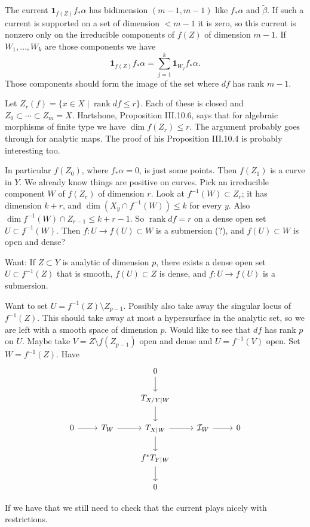 \documentclass[11pt]{amsart}
\theoremstyle{definition}
\newcommand{\cc}[1]{\mathcal{#1}}
\def\rank{\operatorname{rank}}
\begin{document}
The current $\mathbf{1}_{f(Z)} f_* \alpha$ has bidimension $(m-1,m-1)$ like $f_*\alpha$ and $\tilde\beta$.
If such a current is supported on a set of dimension $< m-1$ it is zero, so this current is nonzero only on the irreducible components of $f(Z)$ of dimension $m-1$.
If $W_1, \ldots, W_k$ are those components we have
\[
\mathbf{1}_{f(Z)} f_* \alpha
= \sum_{j=1}^k \mathbf{1}_{W_j} f_*\alpha.
\]
Those components should form the image of the set where $df$ has rank $m-1$.


Let $Z_r(f) = \{ x \in X \mid \rank df \leq r \}$.
Each of these is closed and $Z_0 \subset \cdots \subset Z_m = X$.
Hartshone, Proposition III.10.6, says that for algebraic morphisms of finite type we have $\dim f(Z_r) \leq r$.
The argument probably goes through for analytic maps.
The proof of his Proposition III.10.4 is probably interesting too.

In particular $f(Z_0)$, where $f_*\alpha = 0$, is just some points.
Then $f(Z_1)$ is a curve in $Y$.
We already know things are positive on curves.
Pick an irreducible component $W$ of $f(Z_r)$ of dimension $r$.
Look at $f^{-1}(W) \subset Z_r$; it has dimension $k+r$, and $\dim(X_y \cap f^{-1}(W)) \leq k$ for every $y$.
Also $\dim f^{-1}(W) \cap Z_{r-1} \leq k+r-1$.
So $\rank df = r$ on a dense open set $U \subset f^{-1}(W)$.
Then $f : U \to f(U) \subset W$ is a submersion (?), and $f(U) \subset W$ is open and dense?

Want: If $Z \subset Y$ is analytic of dimension $p$, there exists a dense open set $U \subset f^{-1}(Z)$ that is smooth, $f(U) \subset Z$ is dense, and $f : U \to f(U)$ is a submersion.


Want to set $U = f^{-1}(Z) \setminus Z_{p-1}$.
Possibly also take away the singular locus of $f^{-1}(Z)$.
This should take away at most a hypersurface in the analytic set, so we are left with a smooth space of dimension $p$.
Would like to see that $df$ has rank $p$ on $U$.
Maybe take $V = Z \setminus f(Z_{p-1})$ open and dense and $U = f^{-1}(V)$ open.
Set $W = f^{-1}(Z)$.
Have
\[
\begin{tikzcd}
& & 0 \ar[d] & & 
\\
& & T_{X/Y|W} \ar[d] & &
\\
0 \ar[r] &
T_W \ar[r] &
T_{X|W} \ar[d] \ar[r] &
\cc I_W \ar[r] &
0
\\
& & f^*T_{Y|W} \ar[d] & &
\\
& & 0 & & 
\end{tikzcd}
\]


If we have that we still need to check that the current plays nicely with restrictions.
\end{document}
